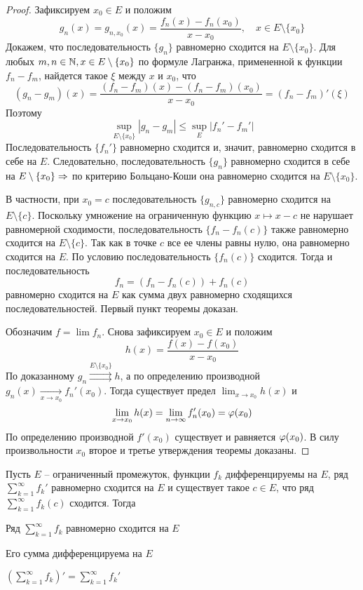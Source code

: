 \begin{proof}
	Зафиксируем $x_0 \in E$ и положим
	\[g_n(x) = g_{n, x_0}(x) = \frac{f_n(x) - f_n(x_0)}{x - x_0}, \quad x \in E \setminus \{x_0\}\]
	Докажем, что последовательность $\{g_n\}$ равномерно сходится на $E \setminus \{x_0\}$. 
	Для любых $m, n \in \mathbb{N}, x \in E \setminus \{x_0\}$ по формуле Лагранжа, примененной к функции $f_n - f_m$, найдется такое $\xi$ между $x$ и $x_0$, что
	\[(g_n - g_m)(x) = \frac{(f_n - f_m)(x) - (f_n - f_m)(x_0)}{x - x_0} = (f_n - f_m)' (\xi)\]
	Поэтому
	\[\sup_{E \setminus \{x_0\}} |g_n - g_m| \leqslant \sup_E |f_n' - f_m'|\]
	Последовательность $\{f_n'\}$ равномерно сходится и, значит, равномерно сходится в себе на $E$.
	Следовательно, последовательность $\{g_n\}$ равномерно сходится в себе на $E \setminus \{x_0\} \Rightarrow$ по критерию Больцано-Коши она равномерно сходится на $E \setminus \{x_0\}$. 

	В частности, при $x_0 = c$ последовательность $\{g_{n, c}\}$ равномерно сходится на $E \setminus \{c\}$. Поскольку умножение на ограниченную функцию $x \mapsto x - c$ не нарушает равномерной сходимости,
	последовательность $\{f_n - f_n(c)\}$ также равномерно сходится на $E \setminus \{c\}$. Так как в точке $c$ все ее члены равны нулю, она равномерно сходится на $E$.
	По условию последовательность $\{f_n(c)\}$ сходится. Тогда и последовательность
	\[f_n = \left(f_n - f_n(c)\right) + f_n(c)\] 
	равномерно сходится на $E$ как сумма двух равномерно сходящихся последовательностей. Первый пункт теоремы доказан.

	Обозначим $f = \lim f_n$. Снова зафиксируем $x_0 \in E$ и положим
	\[h(x) = \frac{f(x) - f(x_0)}{x - x_0}\]
	По доказанному $g_n \overset{E \setminus \{x_0\}}{\rightrightarrows} h$, а по определению производной $g_n(x) \xrightarrow[x \to x_0]{} f_n'(x_0)$. Тогда существует предел $\lim_{x \to x_0} h(x)$ и
	\[\lim_{x \to x_0} h(x) = \lim_{n \to \infty} f_n'(x_0) = \varphi(x_0)\]
	По определению производной $f'(x_0)$ существует и равняется $\varphi(x_0)$.
	В силу произвольности $x_0$ второе и третье утверждения теоремы доказаны.  
\end{proof}

\begin{Thm}
	Пусть $E$ -- ограниченный промежуток, функции $f_k$ дифференцируемы на $E$, ряд $\sum_{k=1}^{\infty} f_k'$ равномерно сходится на $E$ и существует такое $c \in E$, что ряд $\sum_{k=1}^{\infty} f_k(c)$ сходится. 
	Тогда 
	\begin{MyList}
		\item Ряд $\sum_{k=1}^{\infty} f_k$ равномерно сходится на $E$
		\item Его сумма дифференцируема на $E$
		\item $\left(\sum_{k=1}^{\infty} f_k\right)' = \sum_{k=1}^{\infty} f_k'$  
	\end{MyList}
\end{Thm}

